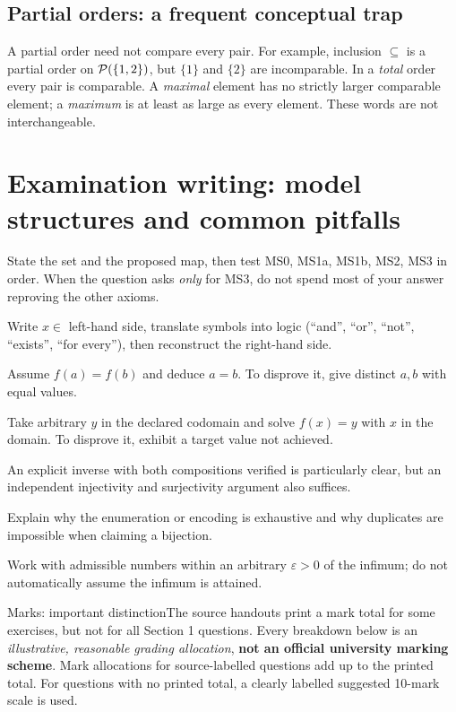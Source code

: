 \documentclass[11pt,a4paper]{article}
\begin{document}
\subsection{Partial orders: a frequent conceptual trap}
A partial order need not compare every pair. For example, inclusion $\subseteq$ is a partial order on $\mathcal P(\{1,2\})$, but $\{1\}$ and $\{2\}$ are incomparable. In a \emph{total} order every pair is comparable. A \emph{maximal} element has no strictly larger comparable element; a \emph{maximum} is at least as large as every element. These words are not interchangeable.
\newpage\section{Examination writing: model structures and common pitfalls}
\begin{description}[style=nextline,leftmargin=13mm]
\item[Prove a distance is a metric] State the set and the proposed map, then test MS0, MS1a, MS1b, MS2, MS3 in order. When the question asks \emph{only} for MS3, do not spend most of your answer reproving the other axioms.
\item[Prove a set identity] Write $x\in$ left-hand side, translate symbols into logic (``and'', ``or'', ``not'', ``exists'', ``for every''), then reconstruct the right-hand side.
\item[Prove injectivity] Assume $f(a)=f(b)$ and deduce $a=b$. To disprove it, give distinct $a,b$ with equal values.
\item[Prove surjectivity] Take arbitrary $y$ in the declared codomain and solve $f(x)=y$ with $x$ in the domain. To disprove it, exhibit a target value not achieved.
\item[Show a map is bijective] An explicit inverse with both compositions verified is particularly clear, but an independent injectivity and surjectivity argument also suffices.
\item[Count a collection] Explain why the enumeration or encoding is exhaustive and why duplicates are impossible when claiming a bijection.
\item[Handle an infimum] Work with admissible numbers within an arbitrary $\varepsilon>0$ of the infimum; do not automatically assume the infimum is attained.
\end{description}
\begin{tipbox}{Marks: important distinction}The source handouts print a mark total for some exercises, but not for all Section 1 questions. Every breakdown below is an \emph{illustrative, reasonable grading allocation}, \textbf{not an official university marking scheme}. Mark allocations for source-labelled questions add up to the printed total. For questions with no printed total, a clearly labelled suggested 10-mark scale is used.\end{tipbox}
\end{document}

